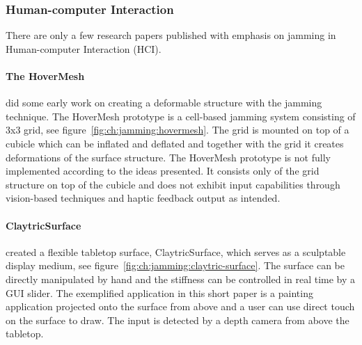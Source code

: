 \subsubsection{Human-computer Interaction}
\label{ch:jamming:related-work:hci}
There are only a few research papers published with emphasis on jamming in Human-computer Interaction (HCI). \todo{\dots}

\paragraph{The HoverMesh}
\label{ch:jamming:related-work:hci:hovermesh}
\citet{mazzone2004hovermesh} did some early work on creating a deformable structure with the jamming technique. 
The HoverMesh prototype is a cell-based jamming system consisting of 3x3 grid, see figure~\ref{fig:ch:jamming:hovermesh}.
The grid is mounted on top of a cubicle which can be inflated and deflated and together with the grid it creates deformations of the surface structure.
The HoverMesh prototype is not fully implemented according to the ideas presented.
It consists only of the grid structure on top of the cubicle and does not exhibit input capabilities through vision-based techniques and haptic feedback output as intended. 

\paragraph{ClaytricSurface}
\label{ch:jamming:related-work:hci:claytric}
\citet{matoba2012claytricsurface} created a flexible tabletop surface, ClaytricSurface, which serves as a sculptable display medium, see figure~\ref{fig:ch:jamming:claytric-surface}. 
The surface can be directly manipulated by hand and the stiffness can be controlled in real time by a GUI slider.
The exemplified application in this short paper is a painting application projected onto the surface from above and a user can use direct touch on the surface to draw. 
The input is detected by a depth camera from above the tabletop.


